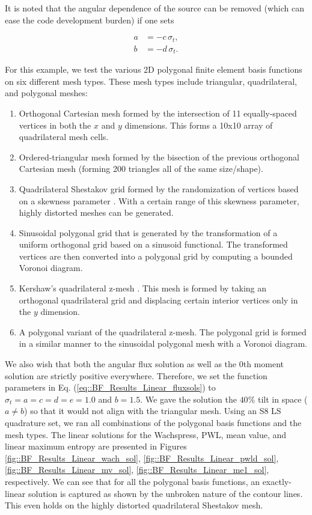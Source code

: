 \noindent It is noted that the angular dependence of the source can be removed (which can ease the code development burden) if one sets

\begin{equation}
\label{eq::BF_Results_Linear_removeterms}
\begin{aligned}
	a &= - c \, \sigma_t, \\
	b &= - d \, \sigma_t.
\end{aligned}
\end{equation}

For this example, we test the various 2D polygonal finite element basis functions on six different mesh types. These mesh types include triangular, quadrilateral, and polygonal meshes:

\begin{enumerate}
	\item Orthogonal Cartesian mesh formed by the intersection of 11 equally-spaced vertices in both the $x$ and $y$ dimensions. This forms a 10x10 array of quadrilateral mesh cells.
	\item Ordered-triangular mesh formed by the bisection of the previous orthogonal Cartesian mesh (forming 200 triangles all of the same size/shape).
	\item Quadrilateral Shestakov grid formed by the randomization of vertices based on a skewness parameter \cite{shestakov1988solution,shestakov1990test}. With a certain range of this skewness parameter, highly distorted meshes can be generated.
	\item Sinusoidal polygonal grid that is generated by the transformation of a uniform orthogonal grid based on a sinusoid functional. The transformed vertices are then converted into a polygonal grid by computing a bounded Voronoi diagram.
	\item Kershaw's quadrilateral z-mesh \cite{kershaw1981differencing}. This mesh is formed by taking an orthogonal quadrilateral grid and displacing certain interior vertices only in the $y$ dimension.
	\item A polygonal variant of the quadrilateral z-mesh. The polygonal grid is formed in a similar manner to the sinusoidal polygonal mesh with a Voronoi diagram.
\end{enumerate}

\noindent We also wish that both the angular flux solution as well as the 0th moment solution are strictly positive everywhere. Therefore, we set the function parameters in Eq. (\ref{eq::BF_Results_Linear_fluxsols}) to $\sigma_t = a = c = d = e = 1.0$ and $b = 1.5$. We gave the solution the $40 \%$ tilt in space ($a \neq b$) so that it would not align with the triangular mesh. Using an S8 LS quadrature set, we ran all combinations of the polygonal basis functions and the mesh types. The linear solutions for the Wachspress, PWL, mean value, and linear maximum entropy are presented in Figures \ref{fig::BF_Results_Linear_wach_sol}, \ref{fig::BF_Results_Linear_pwld_sol}, \ref{fig::BF_Results_Linear_mv_sol}, \ref{fig::BF_Results_Linear_me1_sol}, respectively. We can see that for all the polygonal basis functions, an exactly-linear solution is captured as shown by the unbroken nature of the contour lines. This even holds on the highly distorted quadrilateral Shestakov mesh.


